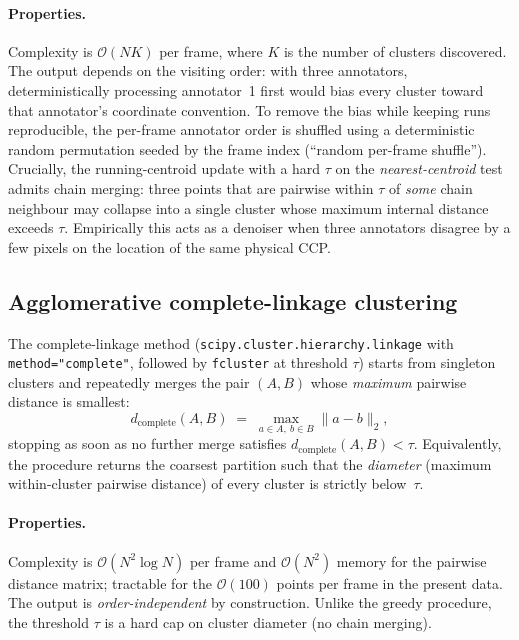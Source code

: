 \paragraph{Properties.}
Complexity is $\mathcal{O}(N K)$ per frame, where $K$ is the number of
clusters discovered. The output depends on the visiting order: with three
annotators, deterministically processing annotator~1 first would bias every
cluster toward that annotator's coordinate convention. To remove the bias
while keeping runs reproducible, the per-frame annotator order is shuffled
using a deterministic random permutation seeded by the frame index
(``random per-frame shuffle''). Crucially, the running-centroid update with
a hard $\tau$ on the \emph{nearest-centroid} test admits chain merging:
three points that are pairwise within $\tau$ of \emph{some} chain neighbour
may collapse into a single cluster whose maximum internal distance exceeds
$\tau$. Empirically this acts as a denoiser when three annotators
disagree by a few pixels on the location of the same physical CCP.

\subsection{Agglomerative complete-linkage clustering}
\label{sec:complete-fusion}

The complete-linkage method (\texttt{scipy.cluster.hierarchy.linkage} with
\texttt{method="complete"}, followed by \texttt{fcluster} at threshold $\tau$)
starts from singleton clusters and repeatedly merges the pair $(A, B)$
whose \emph{maximum} pairwise distance is smallest:
\[
  d_{\text{complete}}(A, B) \;=\;
  \max_{a \in A,\ b \in B} \lVert a - b \rVert_2,
\]
stopping as soon as no further merge satisfies $d_{\text{complete}}(A,B) < \tau$.
Equivalently, the procedure returns the coarsest partition such that the
\emph{diameter} (maximum within-cluster pairwise distance) of every cluster
is strictly below~$\tau$.

\paragraph{Properties.}
Complexity is $\mathcal{O}(N^2 \log N)$ per frame and $\mathcal{O}(N^2)$
memory for the pairwise distance matrix; tractable for the
$\mathcal{O}(100)$ points per frame in the present data. The output is
\emph{order-independent} by construction. Unlike the greedy procedure,
the threshold $\tau$ is a hard cap on cluster diameter (no chain merging).

